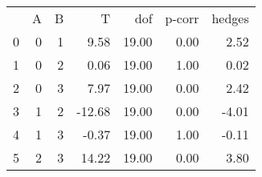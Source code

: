 \begin{tabular}{lrrrrrr}
 & A & B & T & dof & p-corr & hedges \\
0 & 0 & 1 & 9.58 & 19.00 & 0.00 & 2.52 \\
1 & 0 & 2 & 0.06 & 19.00 & 1.00 & 0.02 \\
2 & 0 & 3 & 7.97 & 19.00 & 0.00 & 2.42 \\
3 & 1 & 2 & -12.68 & 19.00 & 0.00 & -4.01 \\
4 & 1 & 3 & -0.37 & 19.00 & 1.00 & -0.11 \\
5 & 2 & 3 & 14.22 & 19.00 & 0.00 & 3.80 \\
\end{tabular}
